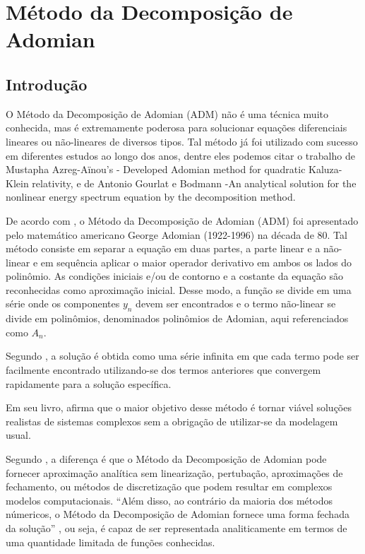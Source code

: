 
\chapter[Método da Decomposição]{Método da Decomposição de Adomian}

\section{Introdução}

   O Método da Decomposição de Adomian (ADM) não é uma técnica muito conhecida, mas é extremamente poderosa para solucionar equações diferenciais lineares ou não-lineares de diversos tipos. Tal método já foi utilizado com sucesso em diferentes estudos ao longo dos anos, dentre eles podemos citar o trabalho de Mustapha Azreg-Aïnou's - Developed Adomian method for quadratic Kaluza-Klein relativity, e de Antonio Gourlat e Bodmann -An analytical solution for the nonlinear energy spectrum equation by the decomposition method.
   
    De acordo com , o Método da Decomposição de Adomian (ADM) foi apresentado pelo  matemático americano George Adomian (1922-1996) na década de 80. Tal método consiste em separar a equação em duas partes, a parte linear e a não-linear e em sequência aplicar o maior operador derivativo em ambos os lados do polinômio. As condições iniciais e/ou de contorno e a costante da equação são reconhecidas como aproximação inicial. Desse modo, a função se divide em uma série onde os componentes $y_{n}$ devem ser encontrados e o termo não-linear se divide em polinômios, denominados polinômios de Adomian, aqui referenciados como $A_{n}$. 
    
    Segundo \cite{convergencia},  a solução é obtida como uma série infinita  em que cada termo pode ser facilmente encontrado utilizando-se dos termos anteriores  que convergem rapidamente para a solução específica.
  
     
   Em seu livro, \cite{Adomian}  afirma que o maior objetivo desse método é tornar viável soluções realistas de sistemas complexos sem a obrigação de utilizar-se da modelagem usual.
   
  Segundo \cite{Jornal}, a diferença é que o Método da Decomposição de Adomian pode fornecer aproximação analítica sem linearização, pertubação, aproximações de fechamento, ou métodos de discretização que podem resultar em complexos modelos computacionais.
   ``Além disso, ao contrário da maioria dos métodos númericos, o Método da Decomposição de Adomian fornece uma forma fechada da solução'' , ou seja, é capaz de ser representada analiticamente em termos de uma quantidade limitada de funções conhecidas.
   
